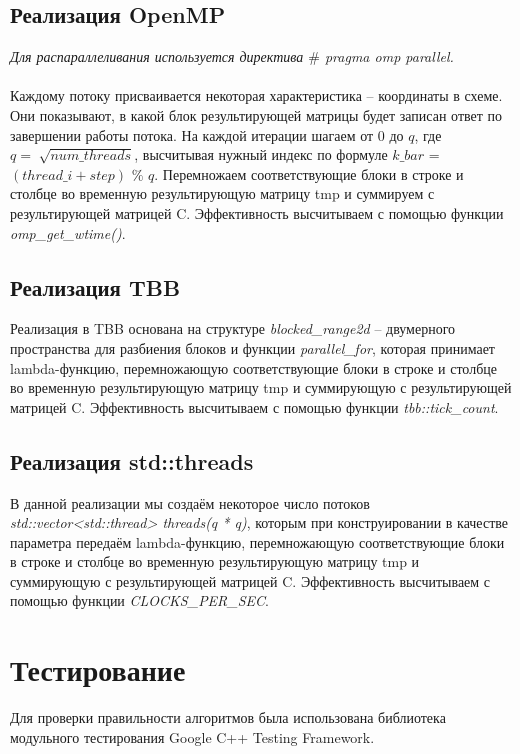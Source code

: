 \documentclass[12pt]{article}
\begin{document}
\subsection{Реализация OpenMP}
\textit{Для распараллеливания используется директива $\#$ pragma omp parallel.}\\ \\
Каждому потоку присваивается некоторая характеристика – координаты в схеме. Они показывают, в какой блок результирующей матрицы будет записан ответ по завершении работы потока. На каждой итерации шагаем от 0 до $q$, где  $ q=\sqrt[]{num \_ threads}$, высчитывая нужный индекс по формуле $k\_bar$ = $(thread\_i+step)$ $\%$  $q$. Перемножаем соответствующие блоки в строке и столбце во временную результирующую матрицу tmp и суммируем с результирующей матрицей C. Эффективность высчитываем с помощью функции \textit{omp\_get\_wtime()}. 

\subsection{Реализация TBB}
Реализация в TBB основана на структуре \textit{blocked\_range2d} -- двумерного пространства для разбиения блоков и функции \textit{parallel\_for}, которая принимает lambda-функцию, перемножающую соответствующие блоки в строке и столбце во временную результирующую матрицу tmp и суммирующую с результирующей матрицей C. Эффективность высчитываем с помощью функции \textit{tbb::tick\_count}.

\subsection{Реализация std::threads}
В данной реализации мы создаём некоторое число потоков \textit{std::vector<std::thread> threads(q * q)}, которым при конструировании в качестве параметра передаём lambda-функцию, перемножающую соответствующие блоки в строке и столбце во временную результирующую матрицу tmp и суммирующую с результирующей матрицей C. Эффективность высчитываем с помощью функции \textit{CLOCKS\_PER\_SEC}.

\newpage

\section*{Тестирование}
Для проверки правильности алгоритмов была использована библиотека модульного тестирования Google C++ Testing Framework.
\end{document}
